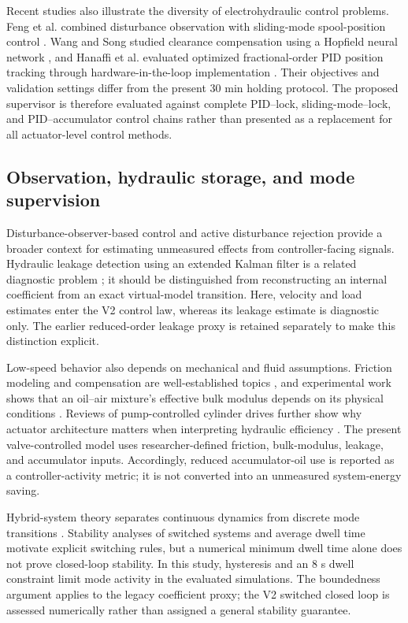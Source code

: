 \documentclass[machines,article,submit,pdftex,moreauthors]{Definitions/mdpi}
\begin{document}
Recent studies also illustrate the diversity of electrohydraulic control problems. Feng et al. combined disturbance observation with sliding-mode spool-position control \cite{feng2025}. Wang and Song studied clearance compensation using a Hopfield neural network \cite{wang2024}, and Hanaffi et al. evaluated optimized fractional-order PID position tracking through hardware-in-the-loop implementation \cite{hanaffi2026}. Their objectives and validation settings differ from the present 30 min holding protocol. The proposed supervisor is therefore evaluated against complete PID--lock, sliding-mode--lock, and PID--accumulator control chains rather than presented as a replacement for all actuator-level control methods.

\subsection{Observation, hydraulic storage, and mode supervision}
Disturbance-observer-based control \cite{chen2016} and active disturbance rejection \cite{han2009} provide a broader context for estimating unmeasured effects from controller-facing signals. Hydraulic leakage detection using an extended Kalman filter is a related diagnostic problem \cite{an2005}; it should be distinguished from reconstructing an internal coefficient from an exact virtual-model transition. Here, velocity and load estimates enter the V2 control law, whereas its leakage estimate is diagnostic only. The earlier reduced-order leakage proxy is retained separately to make this distinction explicit.

Low-speed behavior also depends on mechanical and fluid assumptions. Friction modeling and compensation are well-established topics \cite{wit1995,olsson1998}, and experimental work shows that an oil--air mixture's effective bulk modulus depends on its physical conditions \cite{gholizadeh2013}. Reviews of pump-controlled cylinder drives further show why actuator architecture matters when interpreting hydraulic efficiency \cite{ketelsen2019}. The present valve-controlled model uses researcher-defined friction, bulk-modulus, leakage, and accumulator inputs. Accordingly, reduced accumulator-oil use is reported as a controller-activity metric; it is not converted into an unmeasured system-energy saving.

Hybrid-system theory separates continuous dynamics from discrete mode transitions \cite{goebel2009}. Stability analyses of switched systems \cite{liberzon1999} and average dwell time \cite{hespanha1999} motivate explicit switching rules, but a numerical minimum dwell time alone does not prove closed-loop stability. In this study, hysteresis and an 8 s dwell constraint limit mode activity in the evaluated simulations. The boundedness argument applies to the legacy coefficient proxy; the V2 switched closed loop is assessed numerically rather than assigned a general stability guarantee.
\end{document}
